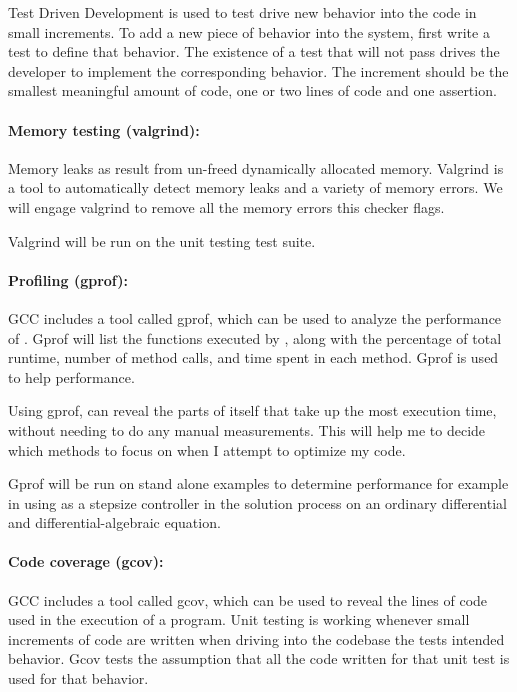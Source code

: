 \documentclass[12pt, titlepage]{article}
\begin{document}
Test Driven Development is used to test drive new behavior into the code in small increments. To
add a new piece of behavior into the system, first write a test to define that behavior. The
existence of a test that will not pass drives the developer to implement the corresponding behavior.
The increment should be the smallest meaningful amount of code, one or two lines of code and one assertion.

\paragraph{Memory testing (valgrind):}
Memory leaks as result from un-freed dynamically allocated memory. Valgrind is a tool to automatically
detect memory leaks and a variety of memory errors. We will engage valgrind to remove all the memory
errors this checker flags.

Valgrind will be run on the unit testing test suite.

\paragraph{Profiling (gprof):}
GCC includes a tool called gprof, which can be used to analyze the performance of .
Gprof will list the functions executed by , along with the percentage of total runtime,
number of method calls, and time spent in each method. Gprof is used to help performance.

Using gprof,  can reveal the parts of itself that take up the most execution time,
without needing to do any manual measurements. This will help me to decide which methods
to focus on when I attempt to optimize my code.

Gprof will be run on stand alone examples to determine performance for example in using 
as a stepsize controller in the solution process on an ordinary differential and differential-algebraic
equation.

\paragraph{Code coverage (gcov):}
GCC includes a tool called gcov, which can be used to reveal the lines of code used in the execution
of a program. Unit testing is working whenever small increments of
code are written when driving into the codebase the tests intended behavior. Gcov tests the
assumption that all the code written for that unit test is used for that behavior.
\end{document}
